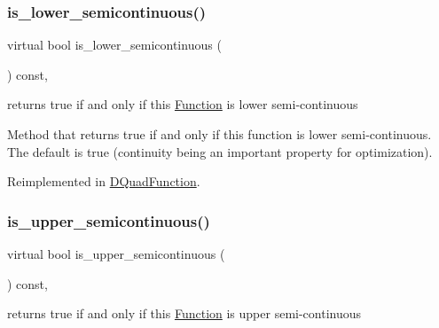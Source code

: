 \subsubsection{\texorpdfstring{is\+\_\+lower\+\_\+semicontinuous()}{is\_lower\_semicontinuous()}}
{\footnotesize\ttfamily virtual bool is\+\_\+lower\+\_\+semicontinuous (\begin{DoxyParamCaption}\item[{void}]{ }\end{DoxyParamCaption}) const\hspace{0.3cm}{\ttfamily [inline]}, {\ttfamily [virtual]}}



returns true if and only if this \mbox{\hyperlink{class_s_m_spp__di__unipi__it_1_1_function}{Function}} is lower semi-\/continuous 

Method that returns true if and only if this function is lower semi-\/continuous. The default is true (continuity being an important property for optimization). 

Reimplemented in \mbox{\hyperlink{class_s_m_spp__di__unipi__it_1_1_d_quad_function_a4999c961244a6547170ef8f1c786cfa5}{D\+Quad\+Function}}.

\mbox{\label{class_s_m_spp__di__unipi__it_1_1_function_afa2086256b54e80d2dcfd11ad6adcd07}} 
\subsubsection{\texorpdfstring{is\+\_\+upper\+\_\+semicontinuous()}{is\_upper\_semicontinuous()}}
{\footnotesize\ttfamily virtual bool is\+\_\+upper\+\_\+semicontinuous (\begin{DoxyParamCaption}\item[{void}]{ }\end{DoxyParamCaption}) const\hspace{0.3cm}{\ttfamily [inline]}, {\ttfamily [virtual]}}



returns true if and only if this \mbox{\hyperlink{class_s_m_spp__di__unipi__it_1_1_function}{Function}} is upper semi-\/continuous 

